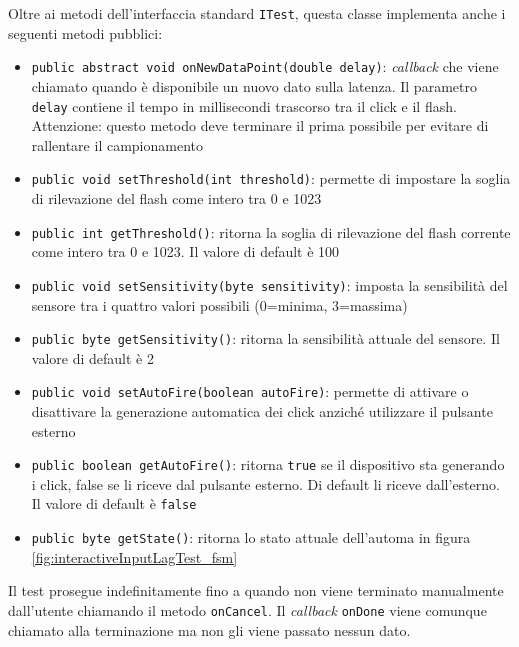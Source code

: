 Oltre ai metodi dell'interfaccia standard \texttt{ITest}, questa classe implementa anche i seguenti metodi pubblici: \begin{itemize}
	\item \texttt{public abstract void onNewDataPoint(double delay)}: \textit{callback} che viene chiamato quando è disponibile un nuovo dato sulla latenza. Il parametro \texttt{delay} contiene il tempo in millisecondi trascorso tra il click e il flash. Attenzione: questo metodo deve terminare il prima possibile per evitare di rallentare il campionamento
	\item \texttt{public void setThreshold(int threshold)}: permette di impostare la soglia di rilevazione del flash come intero tra 0 e 1023
	\item \texttt{public int getThreshold()}: ritorna la soglia di rilevazione del flash corrente come intero tra 0 e 1023. Il valore di default è 100
	\item \texttt{public void setSensitivity(byte sensitivity)}: imposta la sensibilità del sensore tra i quattro valori possibili (0=minima, 3=massima)
	\item \texttt{public byte getSensitivity()}: ritorna la sensibilità attuale del sensore. Il valore di default è 2
	\item \texttt{public void setAutoFire(boolean autoFire)}: permette di attivare o disattivare la generazione automatica dei click anziché utilizzare il pulsante esterno
	\item \texttt{public boolean getAutoFire()}: ritorna \texttt{true} se il dispositivo sta generando i click, false se li riceve dal pulsante esterno. Di default li riceve dall'esterno. Il valore di default è \texttt{false}
	\item \texttt{public byte getState()}: ritorna lo stato attuale dell'automa in figura \ref{fig:interactiveInputLagTest_fsm}
\end{itemize}

Il test prosegue indefinitamente fino a quando non viene terminato manualmente dall'utente chiamando il metodo \texttt{onCancel}. Il \textit{callback} \texttt{onDone} viene comunque chiamato alla terminazione ma non gli viene passato nessun dato.

